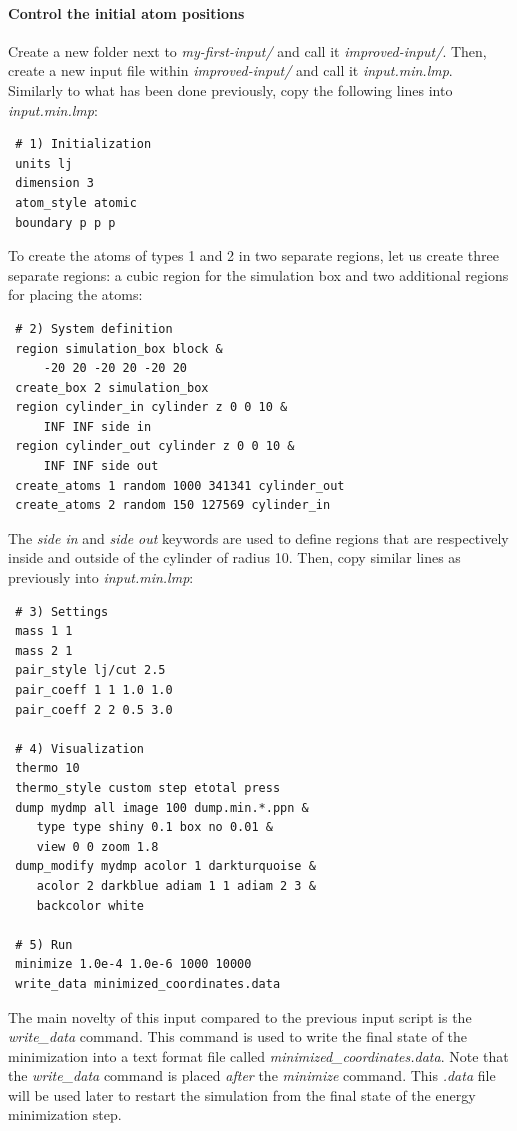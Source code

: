 \documentclass[9pt,tutorial]{livecoms}
\begin{document}
\paragraph{Control the initial atom positions}
Create a new folder next to \textit{my-first-input/} and call it
\textit{improved-input/}. Then, create a new input file within
\textit{improved-input/} and call it \textit{input.min.lmp}. Similarly to what
has been done previously, copy the following lines into \textit{input.min.lmp}:
{\normalsize
\begin{verbatim}
 # 1) Initialization
 units lj
 dimension 3
 atom_style atomic
 boundary p p p
\end{verbatim}
}
To create the atoms of types 1 and 2 in two separate regions, let us create
three separate regions: a cubic region for the simulation box and two additional
regions for placing the atoms:
{\normalsize
\begin{verbatim}
 # 2) System definition
 region simulation_box block &
     -20 20 -20 20 -20 20
 create_box 2 simulation_box
 region cylinder_in cylinder z 0 0 10 &
     INF INF side in
 region cylinder_out cylinder z 0 0 10 &
     INF INF side out
 create_atoms 1 random 1000 341341 cylinder_out
 create_atoms 2 random 150 127569 cylinder_in
\end{verbatim}
}
The \textit{side in} and \textit{side out} keywords are used to define regions
that are respectively inside and outside of the cylinder of radius 10. Then,
copy similar lines as previously into \textit{input.min.lmp}:
{\normalsize
\begin{verbatim}
 # 3) Settings
 mass 1 1
 mass 2 1
 pair_style lj/cut 2.5
 pair_coeff 1 1 1.0 1.0
 pair_coeff 2 2 0.5 3.0

 # 4) Visualization
 thermo 10
 thermo_style custom step etotal press
 dump mydmp all image 100 dump.min.*.ppn &
    type type shiny 0.1 box no 0.01 &
    view 0 0 zoom 1.8
 dump_modify mydmp acolor 1 darkturquoise &
    acolor 2 darkblue adiam 1 1 adiam 2 3 &
    backcolor white

 # 5) Run
 minimize 1.0e-4 1.0e-6 1000 10000
 write_data minimized_coordinates.data
\end{verbatim}
}

The main novelty of this input compared to the previous input script
is the \textit{write\_data} command.  This command is used to write the
final state of the minimization into a text format file called
\textit{minimized\_coordinates.data}.  Note that the \textit{write\_data}
command is placed \emph{after} the \textit{minimize} command.  This
\textit{.data} file will be used later to restart the simulation from
the final state of the energy minimization step.
\end{document}
